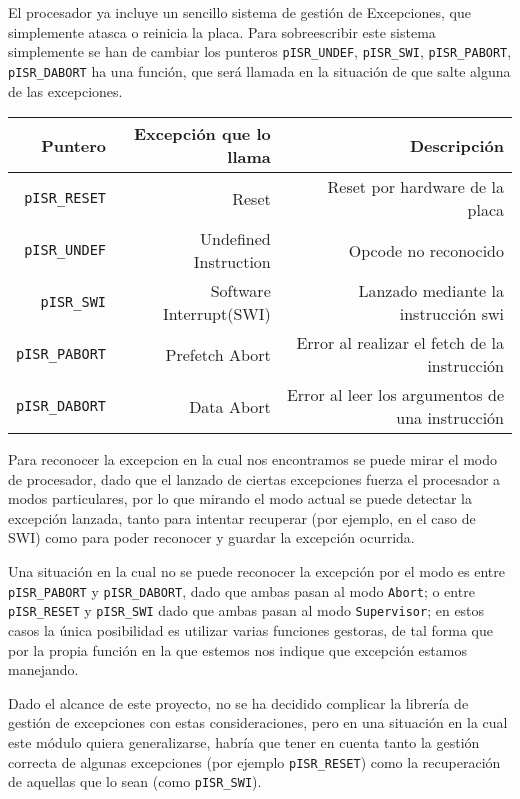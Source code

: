 \documentclass[12pt,letterpaper]{article}
\begin{document}
El procesador ya incluye un sencillo sistema de gestión de
Excepciones, que simplemente atasca o reinicia la placa. Para
sobreescribir este sistema simplemente se han de cambiar los punteros
\texttt{pISR\_UNDEF}, \texttt{pISR\_SWI}, \texttt{pISR\_PABORT},
\texttt{pISR\_DABORT} ha una función, que será llamada en la situación
de que salte alguna de las excepciones.
  \begin{center}
    \begin{tabular}{ r | r | r}
      Puntero                & Excepción que lo llama  & Descripción                                     \\
      \hline
      \texttt{pISR\_RESET}   & Reset                   & Reset por hardware de la placa                  \\
      \texttt{pISR\_UNDEF}   & Undefined Instruction   & Opcode no reconocido                            \\
      \texttt{pISR\_SWI}     & Software Interrupt(SWI) & Lanzado mediante la instrucción swi             \\
      \texttt{pISR\_PABORT}  & Prefetch Abort          & Error al realizar el fetch de la instrucción    \\
      \texttt{pISR\_DABORT}  & Data Abort              & Error al leer los argumentos de una instrucción \\
    \end{tabular}
  \end{center}

Para reconocer la excepcion en la cual nos encontramos se puede mirar
el modo de procesador, dado que el lanzado de ciertas excepciones
fuerza el procesador a modos particulares, por lo que mirando el modo
actual se puede detectar la excepción lanzada, tanto para intentar
recuperar (por ejemplo, en el caso de SWI) como para poder reconocer y
guardar la excepción ocurrida.

Una situación en la cual no se puede reconocer la excepción por el
modo es entre \texttt{pISR\_PABORT} y \texttt{pISR\_DABORT}, dado que
ambas pasan al modo \texttt{Abort}; o entre \texttt{pISR\_RESET} y
\texttt{pISR\_SWI} dado que ambas pasan al modo \texttt{Supervisor};
en estos casos la única posibilidad es utilizar varias funciones
gestoras, de tal forma que por la propia función en la que estemos nos
indique que excepción estamos manejando.

Dado el alcance de este proyecto, no se ha decidido complicar la
librería de gestión de excepciones con estas consideraciones, pero en
una situación en la cual este módulo quiera generalizarse, habría que
tener en cuenta tanto la gestión correcta de algunas excepciones (por
ejemplo \texttt{pISR\_RESET}) como la recuperación de aquellas que lo
sean (como \texttt{pISR\_SWI}).
\end{document}
